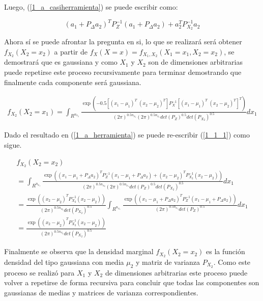 		Luego, (\ref{1_a_casiherramienta}) se puede escribir como:

		\begin{equation}
			(a_1 + P_{\Delta} a_2)^T P_Z^{-1} (a_1 + P_{\Delta} a_2) + a_2^TP_{X_2}^{-1} a_2
			\label{1_a_herramienta}
		\end{equation}

		Ahora sí se puede afrontar la pregunta en si, lo que se realizará será obtener $f_{X_2}(X_2 = x_2)$ a partir de $f_X(X=x) = f_{X_1,X_2}(X_1=x_1,X_2=x_2)$, se demostrará que es gaussiana y como $X_1$ y $X_2$ son de dimensiones arbitrarias puede repetirse este proceso recursivamente para terminar demostrando que finalmente cada componente será gaussiana.

		\begin{eqnarray}
			f_{X_2}(X_2=x_1) = \int_{ R^{ n_{ x_2 } } } \frac{ \exp(-0.5[(x_1 - \mu_1)^T \; (x_2 - \mu_2)^T] P_X^{-1}[(x_1 - \mu_1)^T \; (x_2 - \mu_2)^T]^T ) }{ (2\pi)^{0.5n_{x_1}} (2\pi)^{0.5n_{x_1}} det(P_Z)^{0.5}det(P_{X_2})^{0.5} }   dx_1
			\label{1_1_1}
		\end{eqnarray}

		Dado el resultado en (\ref{1_a_herramienta}) se puede re-escribir (\ref{1_1_1}) como sigue.

		\begin{eqnarray}
			f_{X_2}(X_2=x_2) \\
			= \int_{ R^{ n_{ x_1 } } } \frac{ \exp((x_1 - \mu_1 + P_{\Delta} a_2)^T P_Z^{-1} (x_1 - \mu_1 + P_{\Delta} a_2) + (x_2 - \mu_2)^T P_{X_2}^{-1} (x_2 - \mu_2) )}{ (2\pi)^{0.5n_{x_2}} (2\pi)^{0.5n_{x_1}} det(P_Z)^{0.5}det(P_{X_2})^{0.5} }   dx_1 \\
			= \frac{ \exp((x_2 - \mu_2)^T P_{X_2}^{-1} (x_2 - \mu_2)) } { (2\pi)^{0.5n_{x_2}} det(P_{X_2})^{0.5} }  \int_{ R^{ n_{ x_1 } } } \frac{ \exp( (x_1 - \mu_1 + P_{\Delta} a_2)^T P_Z^{-1} (x_1 - \mu_1 + P_{\Delta} a_2) ) }{ (2\pi)^{0.5n_{x_1}} det(P_Z)^{0.5} }   dx_1 \\
			= \frac{ \exp((x_2 - \mu_2)^T P_{X_2}^{-1} (x_2 - \mu_2)) } { (2\pi)^{0.5n_{x_2}} det(P_{X_2})^{0.5} }
		\end{eqnarray}

		Finalmente se observa que la densidad marginal $f_{X_2}(X_2=x_2)$ es la función densidad del tipo gaussiana con media $\mu_2$ y matriz de varianza $P_{X_2}$. Como este proceso se realizó para $X_1$ y $X_2$ de dimensiones arbitrarias este proceso puede volver a repetirse de forma recursiva para concluir que todas las componentes son gaussianas de medias  y matrices de varianza correspondientes.

